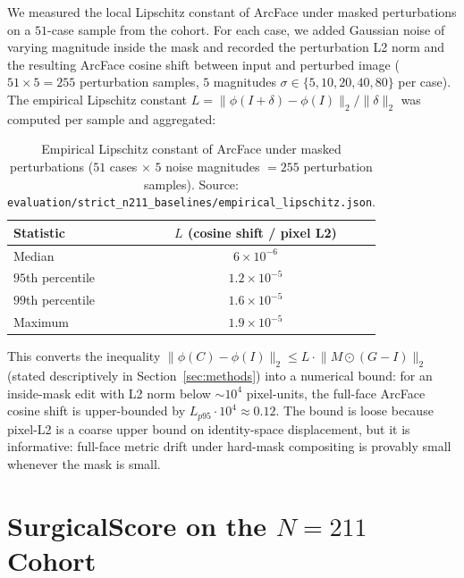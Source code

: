 \documentclass{article}
\begin{document}
We measured the local Lipschitz constant of ArcFace under masked
perturbations on a $51$-case sample from the cohort. For each case,
we added Gaussian noise of varying magnitude inside the mask and recorded
the perturbation L2 norm and the resulting ArcFace cosine shift between
input and perturbed image ($51 \times 5 = 255$ perturbation samples,
$5$ magnitudes $\sigma \in \{5, 10, 20, 40, 80\}$ per case). The empirical
Lipschitz constant
$L = \lVert \phi(I+\delta) - \phi(I) \rVert_2 / \lVert \delta \rVert_2$
was computed per sample and aggregated:

\begin{table}[h]
\centering
\small
\caption{Empirical Lipschitz constant of ArcFace under masked perturbations
($51$ cases $\times$ $5$ noise magnitudes $=255$ perturbation samples). Source:
\texttt{evaluation/strict\_n211\_baselines/empirical\_lipschitz.json}.}
\label{tab:empirical_lipschitz}
\begin{tabular}{@{}lc@{}}
\toprule
\textbf{Statistic} & \textbf{$L$ (cosine shift / pixel L2)} \\
\midrule
Median & $6 \times 10^{-6}$ \\
$95$th percentile & $1.2 \times 10^{-5}$ \\
$99$th percentile & $1.6 \times 10^{-5}$ \\
Maximum & $1.9 \times 10^{-5}$ \\
\bottomrule
\end{tabular}
\end{table}

This converts the inequality
$\lVert \phi(C) - \phi(I) \rVert_2 \leq L \cdot \lVert M \odot (G - I) \rVert_2$
(stated descriptively in Section~\ref{sec:methods}) into a numerical bound:
for an inside-mask edit with L2 norm below $\sim\!10^{4}$ pixel-units, the
full-face ArcFace cosine shift is upper-bounded by $L_{p95} \cdot 10^4
\approx 0.12$. The bound is loose because pixel-L2 is a coarse upper bound on
identity-space displacement, but it is informative: full-face metric drift
under hard-mask compositing is provably small whenever the mask is small.

\section{SurgicalScore on the $N{=}211$ Cohort}
\label{app:ss_strict}
\end{document}
